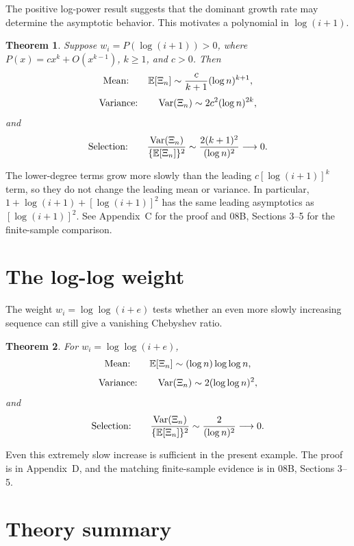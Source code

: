\documentclass[11pt]{article}
\newtheorem{theorem}{Theorem}[section]
\begin{document}
The positive log-power result suggests that the dominant growth rate may
determine the asymptotic behavior.  This motivates a polynomial in
$\log(i+1)$.

\begin{theorem}\label{thm:poly}
Suppose $w_i=P(\log(i+1))>0$, where
$P(x)=cx^k+O(x^{k-1})$, $k\geq1$, and $c>0$.  Then
\[
\textnormal{Mean:}\qquad
\mathbb E[\Xi_n]\sim\frac{c}{k+1}(\log n)^{k+1},
\]
\[
\textnormal{Variance:}\qquad
\operatorname{Var}(\Xi_n)\sim2c^2(\log n)^{2k},
\]
and
\[
\textnormal{Selection:}\qquad
\frac{\operatorname{Var}(\Xi_n)}{\{\mathbb E[\Xi_n]\}^2}
\sim\frac{2(k+1)^2}{(\log n)^2}\longrightarrow0.
\]
\end{theorem}

The lower-degree terms grow more slowly than the leading $c[\log(i+1)]^k$
term, so they do not change the leading mean or variance.  In particular,
$1+\log(i+1)+[\log(i+1)]^2$ has the same leading asymptotics as
$[\log(i+1)]^2$.  See Appendix~C for the proof and 08B, Sections 3--5 for
the finite-sample comparison.

\section{The log-log weight}

The weight $w_i=\log\log(i+e)$ tests whether an even more slowly increasing
sequence can still give a vanishing Chebyshev ratio.

\begin{theorem}\label{thm:loglog}
For $w_i=\log\log(i+e)$,
\[
\textnormal{Mean:}\qquad
\mathbb E[\Xi_n]\sim(\log n)\log\log n,
\]
\[
\textnormal{Variance:}\qquad
\operatorname{Var}(\Xi_n)\sim2(\log\log n)^2,
\]
and
\[
\textnormal{Selection:}\qquad
\frac{\operatorname{Var}(\Xi_n)}{\{\mathbb E[\Xi_n]\}^2}
\sim\frac{2}{(\log n)^2}\longrightarrow0.
\]
\end{theorem}

Even this extremely slow increase is sufficient in the present example.
The proof is in Appendix~D, and the matching finite-sample evidence is in
08B, Sections 3--5.

\section{Theory summary}
\end{document}
